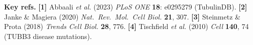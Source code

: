 
\textbf{Key refs.}
\textbf{[1]} Abbaali \emph{et al.} (2023) \emph{PLoS ONE} \textbf{18}: e0295279 (TubulinDB).
\textbf{[2]} Janke \& Magiera (2020) \emph{Nat.\ Rev.\ Mol.\ Cell Biol.} \textbf{21}, 307.
\textbf{[3]} Steinmetz \& Prota (2018) \emph{Trends Cell Biol.} \textbf{28}, 776.
\textbf{[4]} Tischfield \emph{et al.} (2010) \emph{Cell} \textbf{140}, 74 (TUBB3 disease mutations).
